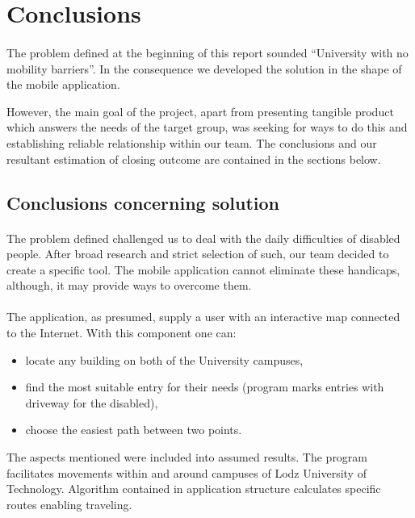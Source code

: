 \documentclass[12pt]{article}
\begin{document}
\section{Conclusions}
\paragraph{}
The problem defined at the beginning of this report sounded ``University with no mobility barriers''.
In the consequence we developed the solution in the shape of the mobile application.

However, the main goal of the project, apart from presenting tangible product which answers the needs of the target group, was seeking for ways to do this and establishing reliable relationship within our team.
The conclusions and our resultant estimation of closing outcome are contained in the sections below.

\subsection{Conclusions concerning solution}
\paragraph{}
The problem defined challenged us to deal with the daily difficulties of disabled people.
After broad research and strict selection of such, our team decided to create a specific tool.
The mobile application cannot eliminate these handicaps, although, it may provide ways to overcome them.

\paragraph{}
The application, as presumed, supply a user with an interactive map connected to the Internet.
With this component one can:
\begin{itemize}
	\item locate any building on both of the University campuses,
	\item find the most suitable entry for their needs (program marks entries with driveway for the disabled),
	\item choose the easiest path between two points.
\end{itemize}
The aspects mentioned were included into assumed results.
The program facilitates movements within and around campuses of Lodz University of Technology.
Algorithm contained in application structure calculates specific routes enabling traveling.
\end{document}
